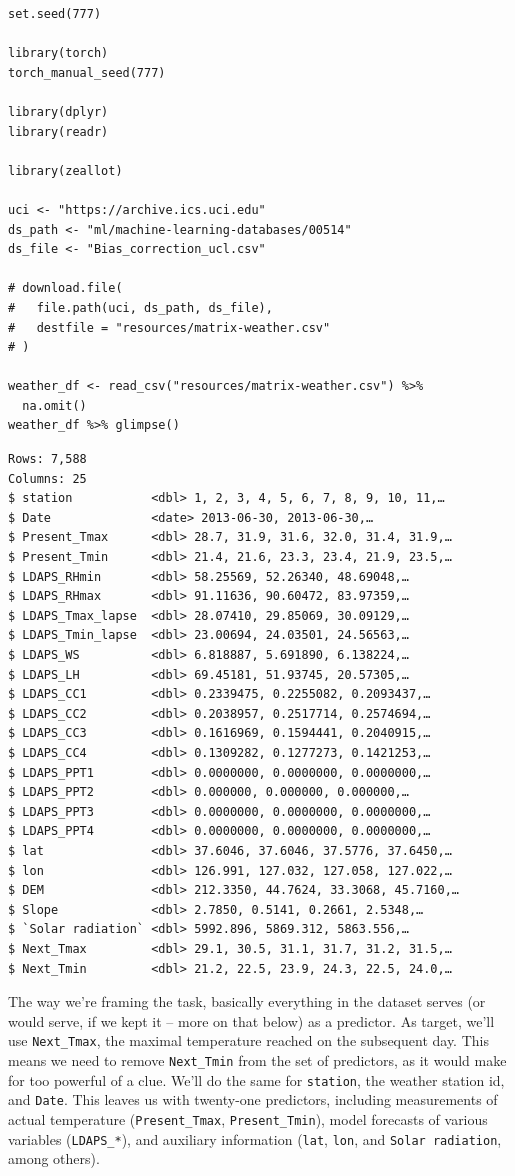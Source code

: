 \documentclass[
  letterpaper,
]{krantz}
\begin{document}
\begin{verbatim}
set.seed(777)

library(torch)
torch_manual_seed(777)

library(dplyr)
library(readr)

library(zeallot)

uci <- "https://archive.ics.uci.edu"
ds_path <- "ml/machine-learning-databases/00514"
ds_file <- "Bias_correction_ucl.csv"

# download.file(
#   file.path(uci, ds_path, ds_file),
#   destfile = "resources/matrix-weather.csv"
# )

weather_df <- read_csv("resources/matrix-weather.csv") %>%
  na.omit()
weather_df %>% glimpse()
\end{verbatim}

\begin{verbatim}
Rows: 7,588
Columns: 25
$ station           <dbl> 1, 2, 3, 4, 5, 6, 7, 8, 9, 10, 11,…
$ Date              <date> 2013-06-30, 2013-06-30,…
$ Present_Tmax      <dbl> 28.7, 31.9, 31.6, 32.0, 31.4, 31.9,…
$ Present_Tmin      <dbl> 21.4, 21.6, 23.3, 23.4, 21.9, 23.5,…
$ LDAPS_RHmin       <dbl> 58.25569, 52.26340, 48.69048,…
$ LDAPS_RHmax       <dbl> 91.11636, 90.60472, 83.97359,…
$ LDAPS_Tmax_lapse  <dbl> 28.07410, 29.85069, 30.09129,…
$ LDAPS_Tmin_lapse  <dbl> 23.00694, 24.03501, 24.56563,…
$ LDAPS_WS          <dbl> 6.818887, 5.691890, 6.138224,…
$ LDAPS_LH          <dbl> 69.45181, 51.93745, 20.57305,…
$ LDAPS_CC1         <dbl> 0.2339475, 0.2255082, 0.2093437,…
$ LDAPS_CC2         <dbl> 0.2038957, 0.2517714, 0.2574694,…
$ LDAPS_CC3         <dbl> 0.1616969, 0.1594441, 0.2040915,…
$ LDAPS_CC4         <dbl> 0.1309282, 0.1277273, 0.1421253,…
$ LDAPS_PPT1        <dbl> 0.0000000, 0.0000000, 0.0000000,…
$ LDAPS_PPT2        <dbl> 0.000000, 0.000000, 0.000000,…
$ LDAPS_PPT3        <dbl> 0.0000000, 0.0000000, 0.0000000,…
$ LDAPS_PPT4        <dbl> 0.0000000, 0.0000000, 0.0000000,…
$ lat               <dbl> 37.6046, 37.6046, 37.5776, 37.6450,…
$ lon               <dbl> 126.991, 127.032, 127.058, 127.022,…
$ DEM               <dbl> 212.3350, 44.7624, 33.3068, 45.7160,…
$ Slope             <dbl> 2.7850, 0.5141, 0.2661, 2.5348,…
$ `Solar radiation` <dbl> 5992.896, 5869.312, 5863.556,…
$ Next_Tmax         <dbl> 29.1, 30.5, 31.1, 31.7, 31.2, 31.5,…
$ Next_Tmin         <dbl> 21.2, 22.5, 23.9, 24.3, 22.5, 24.0,…
\end{verbatim}

The way we're framing the task, basically everything in the dataset
serves (or would serve, if we kept it -- more on that below) as a
predictor. As target, we'll use \texttt{Next\_Tmax}, the maximal
temperature reached on the subsequent day. This means we need to remove
\texttt{Next\_Tmin} from the set of predictors, as it would make for too
powerful of a clue. We'll do the same for \texttt{station}, the weather
station id, and \texttt{Date}. This leaves us with twenty-one
predictors, including measurements of actual temperature
(\texttt{Present\_Tmax}, \texttt{Present\_Tmin}), model forecasts of
various variables (\texttt{LDAPS\_*}), and auxiliary information
(\texttt{lat}, \texttt{lon}, and
\texttt{\textasciigrave{}Solar\ radiation\textasciigrave{}}, among
others).
\end{document}
